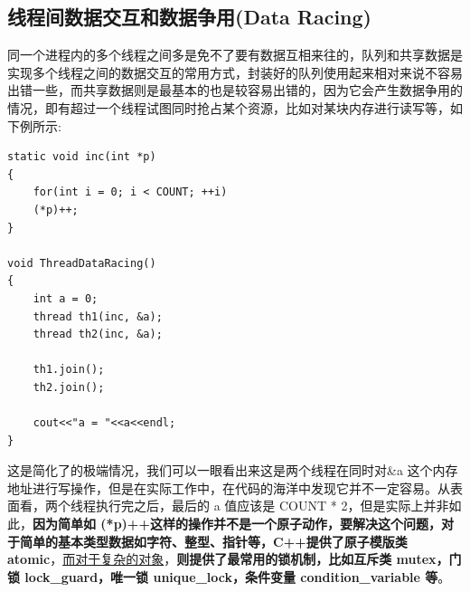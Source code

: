 \documentclass[UTF8,a4paper,12pt]{ctexbook}
\begin{document}
		\subsection{线程间数据交互和数据争用(Data Racing)}
		同一个进程内的多个线程之间多是免不了要有数据互相来往的，队列和共享数据是实现多个线程之间的数据交互的常用方式，封装好的队列使用起来相对来说不容易出错一些，而共享数据则是最基本的也是较容易出错的，因为它会产生数据争用的情况，即有超过一个线程试图同时抢占某个资源，比如对某块内存进行读写等，如下例所示:
		\begin{lstlisting}
static void inc(int *p)
{
	for(int i = 0; i < COUNT; ++i)
	(*p)++;
}
		
void ThreadDataRacing()
{
	int a = 0;
	thread th1(inc, &a);
	thread th2(inc, &a);
		
	th1.join();
	th2.join();
		
	cout<<"a = "<<a<<endl;
}
		\end{lstlisting}
		
		这是简化了的极端情况，我们可以一眼看出来这是两个线程在同时对\&a 这个内存地址进行写操作，但是在实际工作中，在代码的海洋中发现它并不一定容易。从表面看，两个线程执行完之后，最后的 a 值应该是 COUNT * 2，但是实际上并非如此，\textbf{因为简单如 (*p)++这样的操作并不是一个原子动作，要解决这个问题，对于简单的基本类型数据如字符、整型、指针等，C++提供了原子模版类 atomic}，\underline{而对于复杂的对象}，\textbf{则提供了最常用的锁机制，比如互斥类 mutex，门锁 lock\_guard，唯一锁 unique\_lock，条件变量 condition\_variable 等}。
		
\end{document}

